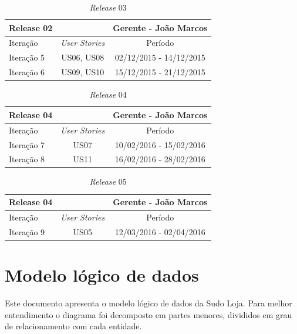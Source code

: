 \documentclass[a4paper,12pt]{monografia}
\begin{document}
\begin{table}[H]
\centering
\caption{\textit{Release} 03}
\label{qua:release03}
\begin{tabular}{|lc|c|}
\rowcolor{ballblue}
\hline
\textbf{Release 02} & & Gerente - João Marcos \\
\hline
Iteração & \textit{\textit{User Stories}} & Período\\
\hline
Iteração 5    & US06, US08    & 02/12/2015 - 14/12/2015\\
Iteração 6    & US09, US10	  & 15/12/2015 - 21/12/2015\\
\hline
\end{tabular}
\end{table}

\begin{table}[H]
\centering
\caption{\textit{Release} 04}
\label{qua:release04}
\begin{tabular}{|lc|c|}
\rowcolor{ballblue}
\hline
\textbf{Release 04} & & Gerente - João Marcos \\
\hline
Iteração & \textit{\textit{User Stories}} & Período\\
\hline
Iteração 7    & US07  & 10/02/2016 - 15/02/2016\\
Iteração 8    & US11  & 16/02/2016 - 28/02/2016\\
\hline
\end{tabular}
\end{table}

\begin{table}[H]
\centering
\caption{\textit{Release} 05}
\label{qua:release05}
\begin{tabular}{|lc|c|}
\rowcolor{ballblue}
\hline
\textbf{Release 04} & & Gerente - João Marcos \\
\hline
Iteração & \textit{\textit{User Stories}} & Período\\
\hline
Iteração 9    & US05  & 12/03/2016 - 02/04/2016\\
\hline
\end{tabular}
\end{table}


\chapter{Modelo lógico de dados} %
\label{cha:modelo_l_gigo_de_dados}

Este documento apresenta o modelo lógico de dados da Sudo Loja. Para melhor entendimento o diagrama foi decomposto em partes menores, divididos em grau de relacionamento com cada entidade.
\end{document}

